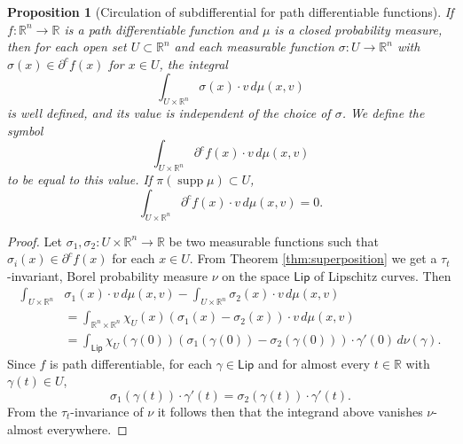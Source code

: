 \documentclass[11pt]{article}
\newtheorem{prop}[thm]{Proposition}
\theoremstyle{definition}
\theoremstyle{remark}
\DeclareMathOperator{\supp}{supp}
\newcommand{\R}{\mathbb{R}}
\newcommand{\lipschitz}{\mathsf{Lip}}
\begin{document}
\begin{prop}[Circulation of subdifferential for path differentiable functions]\label{prop:welldefined}
 If $f\colon\R^n\to\R$ is a path differentiable function and $\mu$ is a closed probability measure, then for each open set $U\subset\R^n$ and each measurable function $\sigma\colon U\to\R^n$ with $\sigma(x)\in\partial^cf(x)$ for $x\in U$, the integral
 \[\int_{U\times\R^n}\sigma(x)\cdot v\,d\mu(x,v)\]
 is well defined, and its value is independent of the choice of $\sigma$. We define the symbol
 \[\int_{U\times \R^n}\partial^cf(x)\cdot v\,d\mu(x,v)\]
 to be equal to this value. If $\pi(\supp\mu)\subset U$, 
  \[\int_{U\times\R^n}\partial^cf(x)\cdot v\,d\mu(x,v)=0.\]
\end{prop}
\begin{proof}
 Let $\sigma_1,\sigma_2\colon U\times\R^n\to\R$ be two measurable functions such that $\sigma_i(x)\in\partial^cf(x)$ for each $x\in U$. From Theorem \ref{thm:superposition} we get a $\tau_t$-invariant, Borel probability measure $\nu$ on the space $\lipschitz$ of Lipschitz curves. Then
 \begin{align*}
  \int_{U\times\R^n}&\sigma_1(x)\cdot v\,d\mu(x,v)-\int_{U\times\R^n}\sigma_2(x)\cdot v\,d\mu(x,v)\\
  &=\int_{\R^n\times\R^n}\chi_U(x)(\sigma_1(x)-\sigma_2(x))\cdot v\,d\mu(x,v)\\
  &=\int_{\lipschitz}\chi_U(\gamma(0))(\sigma_1(\gamma(0))-\sigma_2(\gamma(0)))\cdot \gamma'(0)\,d\nu(\gamma).
 \end{align*}
 Since $f$ is path differentiable, for each $\gamma\in\lipschitz$ and for almost every $t\in\R$ with $\gamma(t)\in U$,
 \[\sigma_1(\gamma(t))\cdot \gamma'(t)=\sigma_2(\gamma(t))\cdot \gamma'(t).\]
 From the $\tau_t$-invariance of $\nu$ it follows then that the integrand above vanishes $\nu$-almost everywhere.
 

\end{proof}
\end{document}
